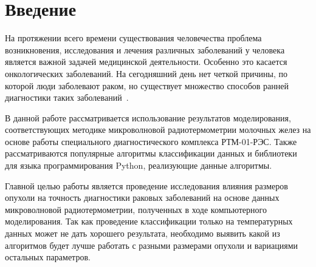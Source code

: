 \newpage
\section{Введение}
На протяжении всего времени существования человечества проблема возникновения, исследования и лечения различных заболеваний у человека является важной задачей медицинской деятельности. Особенно это касается онкологических заболеваний. На сегодняшний день нет четкой причины, по которой люди заболевают раком, но существует множество способов ранней диагностики таких заболеваний~\cite{fear2000}.
\par В данной работе рассматривается использование результатов моделирования, соответствующих методике микроволновой радиотермометрии молочных желез на основе работы специального диагностического комплекса РТМ-01-РЭС. Также рассматриваются популярные алгоритмы классификации данных и библиотеки для языка программирования Python, реализующие данные алгоритмы.
\par Главной целью работы является проведение исследования влияния размеров опухоли на точность  диагностики раковых заболеваний на основе данных микроволновой радиотермометрии, полученных в ходе компьютерного моделирования. Так как проведение классификации только на температурных данных может не дать хорошего результата, необходимо выявить какой из алгоритмов будет лучше работать с разными размерами опухоли и вариациями остальных параметров.
